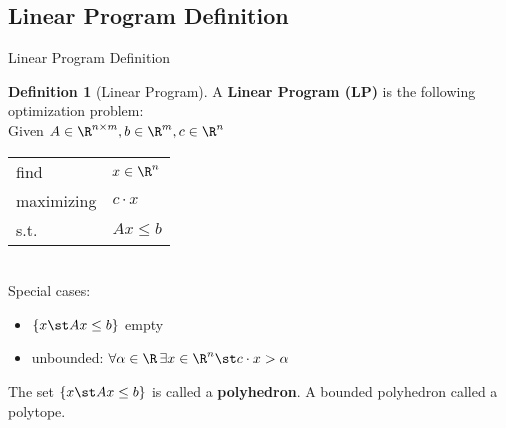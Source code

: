 \documentclass[a4paper, x11names, svgnames]{beamer}
\theoremstyle{definition}
\newtheorem*{defn}{Definition}
\theoremstyle{plain}
\theoremstyle{plain}
\begin{document}
\subsection[LP Definition]{Linear Program Definition}
\begin{frame}{Linear Program Definition}
    \begin{defn}[Linear Program]
        A \textbf{Linear Program (LP)} is the following optimization problem: \\
        \vspace*{0.3cm}
        \hspace*{0.5cm}Given $A \in \R^{n\times m}, b \in \R^m, c\in\R^n$  \\
        \hspace*{1.5cm}  %
        \begin{tabular}{l l}
            find        & $x \in\R^n$  \\  %
            maximizing  & $c\cdot x$   \\
            s.t.        & $Ax \leq b$  \\
        \end{tabular} \\
        \pause
        \vspace{0.3cm}
        Special cases: \\
        \begin{itemize}
            \item $\{x\st Ax\leq b\}$ empty
            \item unbounded: $\forall\alpha\in\R\,\exists x\in\R^n\st c\cdot x > \alpha$
        \end{itemize}
        The set $\{x \st Ax \leq b\}$ is called a \textbf{polyhedron}.
        A bounded polyhedron called a polytope.
    \end{defn}
\end{frame}

\end{document}
